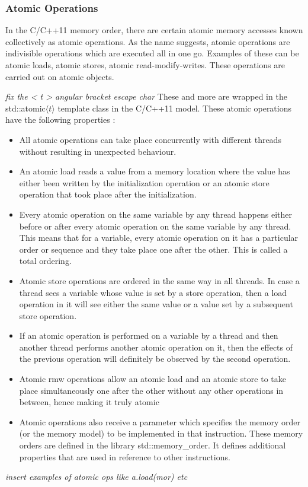 \subsubsection{Atomic Operations}
In the C/C++11 memory order, there are certain atomic memory accesses known collectively as atomic operations. As the name suggests, atomic operations are indivisible operations which are executed all in one go. Examples of these can be atomic loads, atomic stores, atomic read-modify-writes. These operations are carried out on atomic objects.

\par \textit{\color{red}fix the < t > angular bracket escape char}
These and more are wrapped in the std::atomic$\langle t \rangle$ template class in the C/C++11 model. These atomic operations have the following properties \cite{web1} :
\begin{itemize}
\item All atomic operations can take place concurrently with different threads without resulting in unexpected behaviour.
\item An atomic load reads a value from a memory location where the value has either been written by the initialization operation or an atomic store operation that took place after the initialization.
\item Every atomic operation on the same variable by any thread happens either before or after every atomic operation on the same variable by any thread. This means that for a variable, every atomic operation on it has a particular order or sequence and they take place one after the other. This is called a total ordering.
\item Atomic store operations are ordered in the same way in all threads. In case a thread sees a variable whose value is set by a store operation, then a load operation in it will see either the same value or a value set by a subsequent store operation.
\item If an atomic operation is performed on a variable by a thread and then another thread performs another atomic operation on it, then the effects of the previous operation will definitely be observed by the second operation.
\item Atomic rmw operations allow an atomic load and an atomic store to take place simultaneously one after the other without any other operations in between, hence making it truly atomic
\item Atomic operations also receive a parameter which specifies the memory order (or the memory model) to be implemented in that instruction. These memory orders are defined in the library std::memory\_order. It defines additional properties that are used in reference to other instructions.
\end{itemize}
\textit{\color{red} insert examples of atomic ops like a.load(mor) etc}

